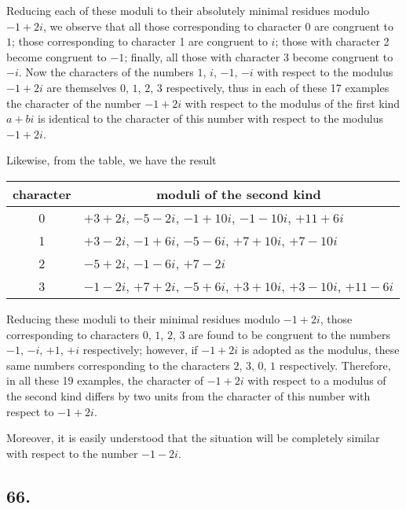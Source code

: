 \documentclass[twoside,12pt]{memoir}
\begin{document}
Reducing each of these moduli to their absolutely minimal residues modulo \(-1+2 i\), we observe that all those corresponding to character \(0\) are congruent to \(1\); those corresponding to character 1 are congruent to \(i\); those with character 2 become congruent to \(-1\); finally, all those with character 3 become congruent to \(-i\). Now the characters of the numbers \(1\), \(i\), \(-1\), \(-i\) with respect to the modulus \(-1+2 i\) are themselves \(0\), \(1\), \(2\), \(3\) respectively, thus in each of these 17 examples the character of the number \(-1+2 i\) with respect to the modulus of the first kind \(a+b i\) is identical to the character of this number with respect to the modulus \(-1+2 i\).

Likewise, from the table, we have the result
\begin{center}
\begin{tabular}{c|l}
character & \multicolumn{1}{c}{moduli of the second kind} \\
\hline
0 & \(+3+2 i\), \(-5-2 i\), \(-1+10 i\), \(-1-10 i\), \(+11+6 i\) \\
1 & \(+3-2 i\), \(-1+6 i\), \(-5-6 i\), \(+7+10 i\), \(+7-10 i\) \\
2 & \(-5+2 i\), \(-1-6 i\), \(+7-2 i\) \\
3 & \(-1-2 i\), \(+7+2 i\), \(-5+6 i\), \(+3+10 i\), \(+3-10 i\), \(+11-6 i\) \\
\end{tabular}
\end{center}
 
Reducing these moduli to their minimal residues modulo \(-1+2 i\), those corresponding to characters \(0\), \(1\), \(2\), \(3\) are found to be congruent to the numbers \(-1\), \(-i\), \(+1\), \(+i\) respectively; however, if \(-1+2 i\) is adopted as the modulus, these same numbers corresponding to the characters \(2\), \(3\), \(0\), \(1\) respectively. Therefore, in all these 19 examples, the character of \(-1+2 i\) with respect to a modulus of the second kind differs by two units from the character of this number with respect to \(-1+2 i\).
 
Moreover, it is easily understood that the situation will be completely similar with respect to the number \(-1-2 i\).

\subsection*{66.}
\end{document}
